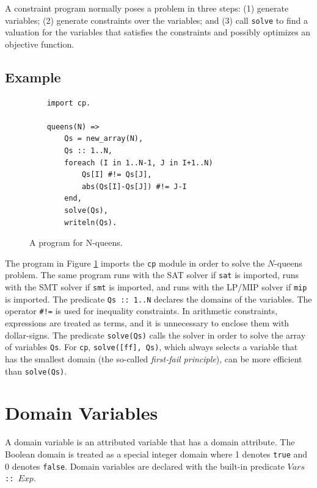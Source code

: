 A constraint program normally poses a problem in three steps: (1) generate variables; (2) generate constraints over the variables; and (3) call \texttt{solve} to find a valuation for the variables that satisfies the constraints and possibly optimizes an objective function.

\subsection*{Example}
\begin{figure}[ht]
\begin{center}
\begin{verbatim}
    import cp.

    queens(N) =>
        Qs = new_array(N),
        Qs :: 1..N,
        foreach (I in 1..N-1, J in I+1..N)
            Qs[I] #!= Qs[J],
            abs(Qs[I]-Qs[J]) #!= J-I
        end,
        solve(Qs),
        writeln(Qs).
\end{verbatim}
\end{center}
\caption{\label{fig:nqueens} A program for N-queens.}
\end{figure}

The program in Figure \ref{fig:nqueens} imports the \texttt{cp} module in order to solve the $N$-queens problem. The same program runs with the SAT solver if \texttt{sat} is imported, runs with the SMT solver if \texttt{smt} is imported, and runs with the LP/MIP solver if \texttt{mip} is imported. The predicate \texttt{Qs :: 1..N} declares the domains of the variables. The operator \verb+#!=+ is used for inequality constraints. In arithmetic constraints, expressions are treated as terms, and it is unnecessary to enclose them with dollar-signs. The predicate \texttt{solve(Qs)} calls the solver in order to solve the array of variables \texttt{Qs}. For \texttt{cp}, \texttt{solve([ff], Qs)}, which always selects a variable that has the smallest domain (the so-called \emph{first-fail principle}), can be more efficient than \texttt{solve(Qs)}.


\section{Domain Variables}
A domain variable is an attributed variable that has a domain attribute. The Boolean domain is treated as a special integer domain where 1 denotes \texttt{true} and 0 denotes \texttt{false}. Domain variables are declared with the built-in predicate \texttt{$Vars$ :: $Exp$}. 

